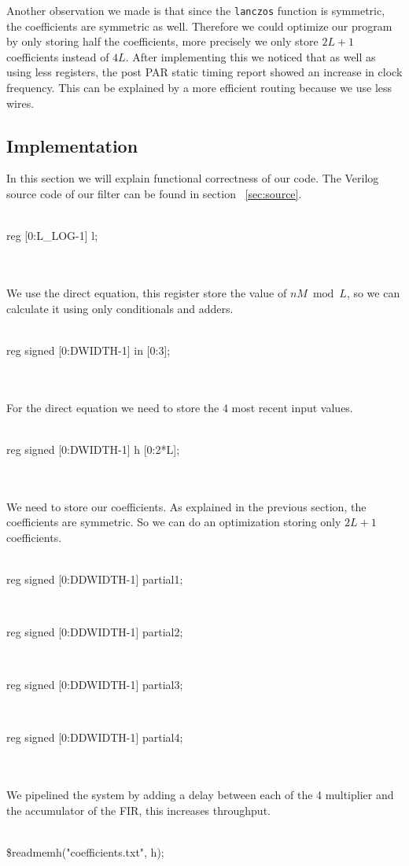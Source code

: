Another observation we made is that since the \texttt{lanczos} function is symmetric, the coefficients are symmetric as well. Therefore we could optimize our program by only storing half the coefficients, more precisely we only store $2L + 1$ coefficients instead of $4L$. After implementing this we noticed that as well as using less registers, the post PAR static timing report showed an increase in clock frequency. This can be explained by a more efficient routing because we use less wires.

\subsection{Implementation}
In this section we will explain functional correctness of our code. The Verilog source code of our filter can be found in section ~\ref{sec:source}. \\
\\
\centerline{reg [0:L\_LOG-1] l;}\\
\\
We use the direct equation, this register store the value of $nM \bmod L$, so we can calculate it using only conditionals and adders.\\
\\
\centerline{reg signed [0:DWIDTH-1] in [0:3];}\\
\\
For the direct equation we need to store the 4 most recent input values.\\
\\
\centerline{reg signed [0:DWIDTH-1] h [0:2*L];}\\
\\
We need to store our coefficients. As explained in the previous section, the coefficients are symmetric. So we can do an optimization storing only $2L + 1$ coefficients.\\
\\
\centerline{reg signed [0:DDWIDTH-1] partial1;}\\
\centerline{reg signed [0:DDWIDTH-1] partial2;}\\
\centerline{reg signed [0:DDWIDTH-1] partial3;}\\
\centerline{reg signed [0:DDWIDTH-1] partial4;}\\
\\
We pipelined the system by adding a delay between each of the 4 multiplier and the accumulator of the FIR, this increases throughput.\\
\\
\centerline{\$readmemh("coefficients.txt", h);}\\
